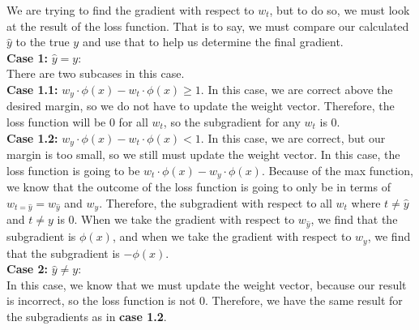 \documentclass[12pt]{article}
\begin{document}
\begin{enumerate}[label=(\alph*)]
We are trying to find the gradient with respect to $w_t$, but to do so, we must look at the result of the loss function. That is to say, we must compare our calculated $\hat y$ to the true $y$ and use that to help us determine the final gradient.\\
\textbf{Case 1:} $\hat y = y$:\\
There are two subcases in this case.\\
\textbf{Case 1.1:} $w_{y} \cdot \phi(x) - w_{t} \cdot \phi(x) \ge 1$. In this case, we are correct above the desired margin, so we do not have to update the weight vector. Therefore, the loss function will be 0 for all $w_t$, so the subgradient for any $w_t$ is 0.\\
\textbf{Case 1.2:} $w_{y} \cdot \phi(x) - w_{t} \cdot \phi(x) < 1$. In this case, we are correct, but our margin is too small, so we still must update the weight vector. In this case, the loss function is going to be $w_{t} \cdot \phi(x) - w_{y} \cdot \phi(x)$. Because of the max function, we know that the outcome of the loss function is going to only be in terms of $w_{t=\hat y} = w_{\hat y}$ and $w_y$. Therefore, the subgradient with respect to all $w_t$ where $t \ne \hat y$ and $t \ne y$ is 0. When we take the gradient with respect to $w_{\hat y}$, we find that the subgradient is $\phi(x)$, and when we take the gradient with respect to $w_y$, we find that the subgradient is $-\phi(x)$.\\
\textbf{Case 2:} $\hat y \ne y$:\\
In this case, we know that we must update the weight vector, because our result is incorrect, so the loss function is not 0. Therefore, we have the same result for the subgradients as in \textbf{case 1.2}.\\
\end{enumerate}
\end{document}
